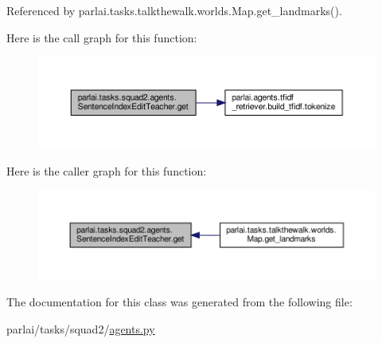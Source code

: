 Referenced by parlai.\+tasks.\+talkthewalk.\+worlds.\+Map.\+get\+\_\+landmarks().

Here is the call graph for this function\+:
\nopagebreak
\begin{figure}[H]
\begin{center}
\leavevmode
\includegraphics[width=350pt]{classparlai_1_1tasks_1_1squad2_1_1agents_1_1SentenceIndexEditTeacher_afb925573397b65655e1375f2f501b545_cgraph}
\end{center}
\end{figure}
Here is the caller graph for this function\+:
\nopagebreak
\begin{figure}[H]
\begin{center}
\leavevmode
\includegraphics[width=350pt]{classparlai_1_1tasks_1_1squad2_1_1agents_1_1SentenceIndexEditTeacher_afb925573397b65655e1375f2f501b545_icgraph}
\end{center}
\end{figure}


The documentation for this class was generated from the following file\+:\begin{DoxyCompactItemize}
\item 
parlai/tasks/squad2/\hyperlink{parlai_2tasks_2squad2_2agents_8py}{agents.\+py}\end{DoxyCompactItemize}
